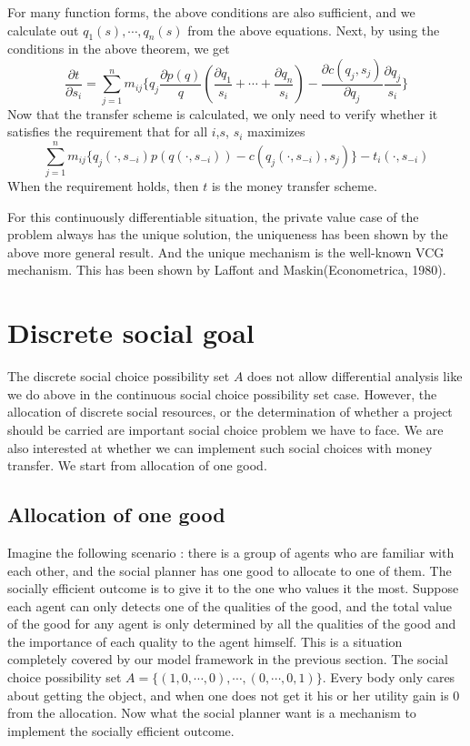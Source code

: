 For many function forms, the above conditions are also sufficient, and we calculate out ${q_1(s),\cdots,q_n(s)}$ from the above 
equations. Next, by using the conditions in the above theorem, we get 
$$\frac{\partial t}{\partial s_i} = \sum_{j=1}^{n} m_{ij}\{q_j\frac {\partial p(q)}{q}(\frac{\partial q_1}{s_i}+\cdots+\frac{\partial q_n}{s_i})-\frac {\partial c(q_j,s_j)}{\partial q_j}\frac{\partial q_j}{s_i}\}$$
Now that the transfer scheme is calculated, we only need to verify whether it satisfies the requirement that for all $i$,$s$,  $s_i$ maximizes  
$$\sum_{j=1}^{n} m_{ij}\{q_j(\cdot,s_{-i})p(q(\cdot,s_{-i}))-c(q_j(\cdot,s_{-i}),s_j)\}-t_i(\cdot,s_{-i})$$
When the requirement holds, then $t$ is the money transfer scheme.

For this continuously differentiable situation, the private value case of the problem always has the unique solution, the uniqueness
has been shown by the above more general result. And the unique mechanism is the well-known VCG mechanism. This has been shown by
Laffont and Maskin(Econometrica, 1980). 

\section{Discrete social goal}
The discrete social choice possibility set $A$ does not allow differential analysis like we do above in the continuous social choice
possibility set case. However, the allocation of discrete social resources, or the determination of whether a project should be carried
are important social choice problem we have to face. We are also interested at whether we can implement such social choices with money
transfer. We start from allocation of one good.

\subsection{Allocation of one good  }

Imagine the following scenario : there is a group of agents who are familiar with each other, and the social planner has
one good to allocate to one of them. The socially efficient outcome is to give it to the one who 
values it the most. Suppose each agent can only detects one of the qualities of the good, and the total value of the 
good for any agent is only determined by all the qualities of the good and the importance of each quality to the agent 
himself. This is a situation completely covered by our model framework in the previous section. The social choice possibility
set $A=\{(1,0,\cdots,0),\cdots,(0,\cdots,0,1)\}$. Every body only cares about getting the object, and when one does not get it his or
her utility gain is 0 from the allocation. Now what the social planner want is a mechanism to implement the socially efficient outcome. 

